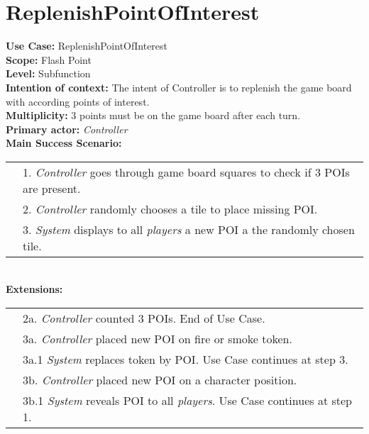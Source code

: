 \documentclass{article}
\begin{document}
	\section*{ReplenishPointOfInterest}
	\textbf{Use Case:} ReplenishPointOfInterest\\
	\textbf{Scope:} Flash Point\\
	\textbf{Level:} Subfunction\\
	\textbf{Intention of context:} The intent of Controller is to replenish the game board with according points of interest.\\
	\textbf{Multiplicity:} 3 points must be on the game board after each turn.\\
	\textbf{Primary actor:} \textit{Controller}\\
	\textbf{Main Success Scenario:}\\
	\begin{tabular}{l l}
		&1. \textit{Controller} goes through game board squares to check if 3 POIs are present.\\
		&2. \textit{Controller} randomly chooses a tile to place missing POI.\\
		&3. \textit{System} displays to all \textit{players} a new POI a the randomly chosen tile.
	\end{tabular}\\
	\textbf{Extensions:}\\
	\begin{tabular}{l l}
		&2a. \textit{Controller} counted 3 POIs. End of Use Case.\\
		&3a. \textit{Controller} placed new POI on fire or smoke token.\\
		&\qquad3a.1 \textit{System} replaces token by POI. Use Case continues at step 3.\\
		&3b. \textit{Controller} placed new POI on a character position.\\
		&\qquad3b.1 \textit{System} reveals POI to all \textit{players}. Use Case continues at step 1.
	\end{tabular}
\end{document}
